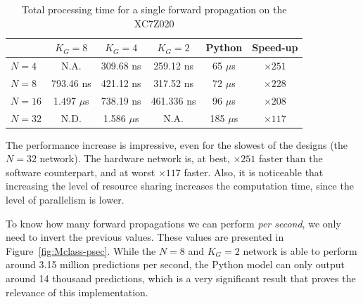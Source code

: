 \documentclass[conference]{IEEEtran}
\begin{document}
\begin{table}
	\caption{Total processing time for a single forward propagation on the XC7Z020}
	\label{tab:process-time}
    \centering
    \begin{tabular}{ | l | c | c | c | c | c | }
    \hline
    & $K_G=8$  & $K_G=4$ & $K_G=2$ & Python & Speed-up \\
    \hline
    $N=4$ & N.A.  & 309.68 ns  & 259.12 ns & 65 $\mu$s & $\times251$ \\
    \hline
    $N=8$ & 793.46 ns  & 421.12 ns  &  317.52 ns & 72 $\mu$s & $\times228$ \\
    \hline
    $N=16$ & 1.497 $\mu$s  & 738.19 ns  & 461.336 ns & 96 $\mu$s & $\times208$ \\
    \hline
    $N=32$ & N.D.          & 1.586 $\mu$s & N.A.       & 185 $\mu$s  &  $\times117$ \\
		\hline
  \end{tabular}
\end{table}
The performance increase is impressive, even for the slowest of the designs (the $N=32$ network). The hardware network is, at best, $\times251$ faster than the software counterpart,
and at worst $\times117$ faster. Also, it is noticeable that increasing the level of resource sharing increases the computation time, since the level of parallelism is lower.

To know how many forward propagations we can perform \emph{per second},
we only need to invert the previous values. These values are presented in Figure~\ref{fig:Mclass-psec}. While the $N=8$ and $K_G=2$ network is able to
perform around 3.15 million predictions per second, the Python model can only output around 14 thousand predictions, which is a very significant result that
proves the relevance of this implementation.
\end{document}
